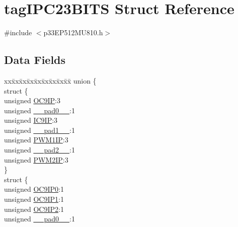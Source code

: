 \hypertarget{structtag_i_p_c23_b_i_t_s}{}\section{tag\+I\+P\+C23\+B\+I\+TS Struct Reference}
\label{structtag_i_p_c23_b_i_t_s}


{\ttfamily \#include $<$p33\+E\+P512\+M\+U810.\+h$>$}

\subsection*{Data Fields}
\begin{DoxyCompactItemize}
\item 
\begin{tabbing}
xx\=xx\=xx\=xx\=xx\=xx\=xx\=xx\=xx\=\kill
union \{\\
\>struct \{\\
\>\>unsigned \hyperlink{structtag_i_p_c23_b_i_t_s_a112ef8301d09518686fd6b3f8dba4334}{OC9IP}:3\\
\>\>unsigned \hyperlink{structtag_i_p_c23_b_i_t_s_adf71f3d8410c1f1dbbc96680a92c49af}{\_\_pad0\_\_}:1\\
\>\>unsigned \hyperlink{structtag_i_p_c23_b_i_t_s_a51bda4afcdcba68c3444f052e1e5306d}{IC9IP}:3\\
\>\>unsigned \hyperlink{structtag_i_p_c23_b_i_t_s_acaf2d0924a107ec6e8d2e31febaf66f9}{\_\_pad1\_\_}:1\\
\>\>unsigned \hyperlink{structtag_i_p_c23_b_i_t_s_ae4f3fba74cd5dcaf2d8ca150199755c6}{PWM1IP}:3\\
\>\>unsigned \hyperlink{structtag_i_p_c23_b_i_t_s_a4d97cc5f7d51d22fc2bf3eab35c9cb7f}{\_\_pad2\_\_}:1\\
\>\>unsigned \hyperlink{structtag_i_p_c23_b_i_t_s_a74fd5f0cccd10627e2e519e890567af5}{PWM2IP}:3\\
\>\} \\
\>struct \{\\
\>\>unsigned \hyperlink{structtag_i_p_c23_b_i_t_s_af21a6c912a7aa4bb540b2fd223aeab7b}{OC9IP0}:1\\
\>\>unsigned \hyperlink{structtag_i_p_c23_b_i_t_s_a3dd1f2af1c0384d1f53e237683c95a1d}{OC9IP1}:1\\
\>\>unsigned \hyperlink{structtag_i_p_c23_b_i_t_s_afe4229a0cdb88c5ea3b3ddcc15a3f03d}{OC9IP2}:1\\
\>\>unsigned \hyperlink{structtag_i_p_c23_b_i_t_s_adf71f3d8410c1f1dbbc96680a92c49af}{\_\_pad0\_\_}:1\\

\end{tabbing}
\end{DoxyCompactItemize}
